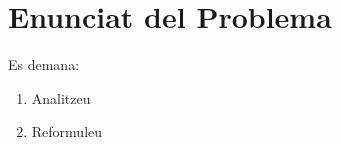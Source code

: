 \section{Enunciat del Problema}


\begin{center}
\end{center}

Es demana:
\begin{enumerate}[label=\alph*]
    \item Analitzeu 
    \item Reformuleu 
\end{enumerate}

